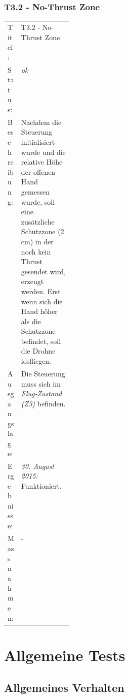 \subsubsection{T3.2 - No-Thrust Zone}
\begin{table}[H]
	\centering
	\small\renewcommand{\arraystretch}{1.4}
	\begin{tabularx}{0.9\textwidth}{ L{0.15\linewidth} | X  }%
		\hline
		Titel: & T3.2 - No-Thrust Zone\\
		Status: & \textit{ok}\\
		Beschreibung: &  
		Nachdem die Steuerung initialisiert wurde und die relative Höhe der offenen Hand gemessen wurde, soll eine zusätzliche Schutzzone (2\,cm) in der noch kein Thrust gesendet wird, erzeugt werden.
		Erst wenn sich die Hand höher als die Schutzzone befindet, soll die Drohne losfliegen.
		\\
		Ausgangslage: & Die Steuerung muss sich im \textit{Flug-Zustand (Z3)} befinden.\\
		Ergebnisse: & \textit{30. August 2015:}
		Funktioniert.
		\\
		Massnahmen: & -\\
		\hline
	\end{tabularx}
\end{table}




\section{Allgemeine Tests}
\label{sec:generalTest}
\subsection{Allgemeines Verhalten}
